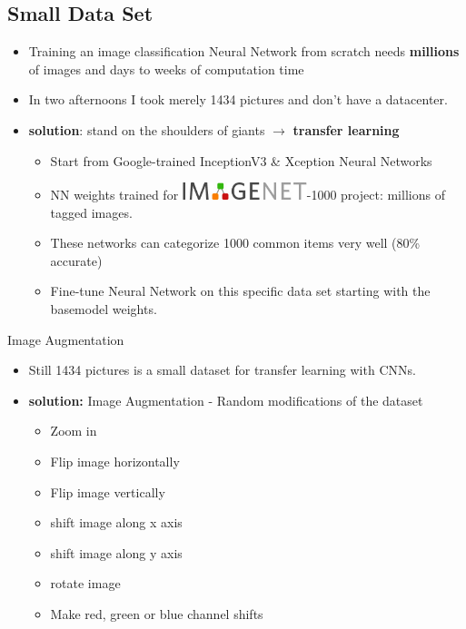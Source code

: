 \documentclass{beamer}
\begin{document}
\subsection{Small Data Set}
\begin{frame}
\begin{itemize}
 \item Training an image classification Neural Network from scratch needs \textbf{millions} of images and days to weeks of computation time 
 \item In two afternoons I took merely 1434 pictures and don't have a datacenter.
 \item \textbf{solution}: stand on the shoulders of giants $\rightarrow$ \textbf{transfer learning}
  \begin{itemize}
    \item Start from Google-trained InceptionV3 \& Xception Neural Networks
    \item NN weights trained for \includegraphics[width=0.3\textwidth]{imagenet.jpg}-1000 project: millions of tagged images.
    \item These networks can categorize 1000 common items very well (80\% accurate)
    \item Fine-tune Neural Network on this specific data set starting with the basemodel weights.
  \end{itemize}
\end{itemize}
\end{frame}

\begin{frame}{Image Augmentation}
\begin{itemize}
  \item Still 1434 pictures is a small dataset for transfer learning with CNNs. 
  \item \textbf{solution:} Image Augmentation - Random modifications of the dataset
  \begin{itemize}
	\item Zoom in
	\item Flip image horizontally 
	\item Flip image vertically 
	\item shift image along x axis
	\item shift image along y axis
	\item rotate image 
	\item Make red, green or blue channel shifts
  \end{itemize}
\end{itemize}
\end{frame}
\end{document}

